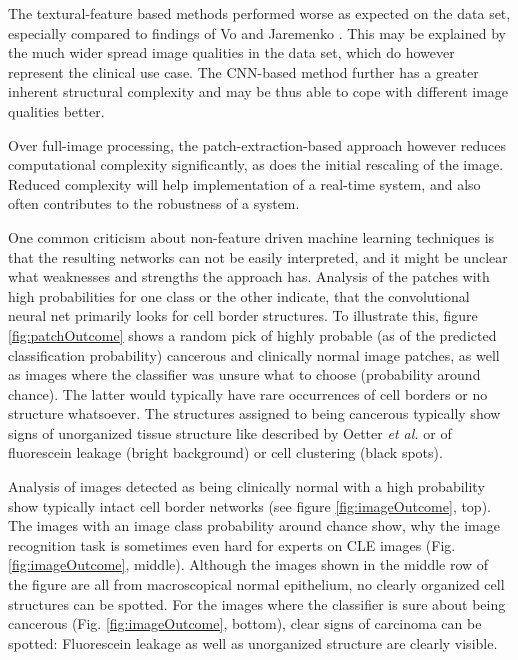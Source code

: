 \documentclass[fleqn,10pt]{wlscirep}
\begin{document}
The textural-feature based methods performed worse as expected on the data set, especially compared to findings of Vo \cite{Vo:2016} and Jaremenko \cite{Jaremenko:2015kh}. This may be explained by the much wider spread image qualities in the data set, which do however represent the clinical use case. The CNN-based method further has a greater inherent structural complexity and may be thus able to cope with different image qualities better.

Over full-image processing, the patch-extraction-based approach however reduces computational complexity significantly, as does the initial rescaling of the image. Reduced complexity will help implementation of a real-time system, and also often contributes to the robustness of a system. 
 
One common criticism about non-feature driven machine learning techniques is that the resulting networks can not be easily interpreted, and it might be unclear what weaknesses and strengths the approach has. Analysis of the patches with high probabilities for one class or the other indicate, that the convolutional neural net primarily looks for cell border structures. To illustrate this, figure \ref{fig:patchOutcome} shows a random pick of highly probable (as of the predicted classification probability) cancerous and clinically normal image patches, as well as images where the classifier was unsure what to choose (probability around chance). The latter would typically have rare occurrences of cell borders or no structure whatsoever. The structures assigned to being cancerous typically show signs of unorganized tissue structure like described by Oetter \textit{et al.}\cite{Oetter:2016cp} or of fluorescein leakage (bright background) or cell clustering (black spots).


Analysis of images detected as being clinically normal with a high probability show typically intact cell border networks (see figure \ref{fig:imageOutcome}, top). The images with an image class probability around chance show, why the image recognition task is sometimes even hard for experts on CLE images (Fig. \ref{fig:imageOutcome}, middle). Although the images shown in the middle row of the figure are all from macroscopical normal epithelium, no clearly organized cell structures can be spotted. For the images where the classifier is sure about being cancerous (Fig. \ref{fig:imageOutcome}, bottom), clear signs of carcinoma can be spotted: Fluorescein leakage as well as unorganized structure are clearly visible. 
\end{document}
